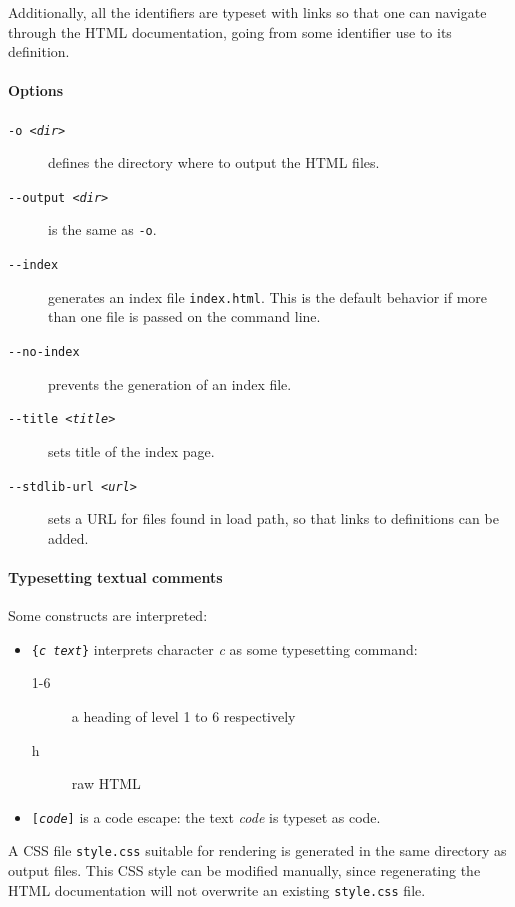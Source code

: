 Additionally, all the \why identifiers are typeset with links so that
one can navigate through the HTML documentation, going from some
identifier use to its definition.

\paragraph{Options}

\begin{description}
\item[\texttt{-o \textsl{<dir>}}] defines the directory where to
  output the HTML files.
\item[\texttt{-{}-output \textsl{<dir>}}] is the same as \verb|-o|.
\item[\texttt{-{}-index}] generates an index file \texttt{index.html}.
  This is the default behavior if more than one file
  is passed on the command line.
\item[\texttt{-{}-no-index}] prevents the generation of an index file.
\item[\texttt{-{}-title \textsl{<title>}}] sets title of the
  index page.
\item[\texttt{-{}-stdlib-url \textsl{<url>}}] sets a URL for files
  found in load path, so that links to definitions can be added.
\end{description}

\paragraph{Typesetting textual comments}

Some constructs are interpreted:
\begin{itemize}
\item \texttt{\{\textsl{c text}\}} interprets character \textsl{c} as
  some typesetting command:
  \begin{description}
  \item[1-6] a heading of level 1 to 6 respectively
  \item[h] raw HTML
  \end{description}
\item \texttt{[\textsl{code}]} is a code escape: the text
  \textsl{code} is typeset as \why code.
\end{itemize}

A CSS file \verb|style.css| suitable for rendering is generated in the
same directory as output files. This CSS style can be modified manually,
since regenerating the HTML documentation will not overwrite an existing
\verb|style.css| file.

